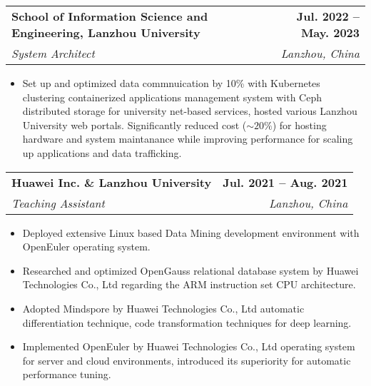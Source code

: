 \documentclass[letterpaper,11pt]{article}
\makeatletter
\newcommand{\resumeItem}[1]{
  \item\small{
    {#1 \vspace{-2pt}}
  }
}
\newcommand{\resumeSubheading}[4]{
  \vspace{-2pt}\item
    \begin{tabular*}{1.0\textwidth}[t]{l@{\extracolsep{\fill}}r}
      \textbf{#1} & \textbf{\small #2} \\
      \textit{\small#3} & \textit{\small #4} \\
    \end{tabular*}\vspace{-7pt}
}
\newcommand{\resumeItemListStart}{\begin{itemize}}
\newcommand{\resumeItemListEnd}{\end{itemize}\vspace{-5pt}}
\makeatother
\begin{document}
    
    \resumeSubheading
    {School of Information Science and Engineering, Lanzhou University}{Jul. 2022 -- May. 2023}
    {System Architect}{Lanzhou, China}
    \resumeItemListStart
    \resumeItem{Set up and optimized data commnuication by 10\% with Kubernetes clustering containerized applications management system with Ceph distributed storage for university net-based services, hosted various Lanzhou University web portals. Significantly reduced cost ($\sim 20\%$) for hosting hardware and system maintanance while improving performance for scaling up applications and data trafficking.}
    \resumeItemListEnd
    \resumeSubheading
      {Huawei Inc. \& Lanzhou University}{Jul. 2021 -- Aug. 2021}
      {Teaching Assistant}{Lanzhou, China}
      \resumeItemListStart
        \resumeItem{Deployed extensive Linux based Data Mining development environment with OpenEuler\textsuperscript{\tiny\textregistered} operating system.}
        \resumeItem{Researched and optimized OpenGauss\textsuperscript{\tiny\textregistered} relational database system by Huawei Technologies Co., Ltd regarding the ARM instruction set CPU architecture.} 
        \resumeItem{Adopted Mindspore\textsuperscript{\tiny\textregistered} by Huawei Technologies Co., Ltd automatic differentiation technique, code transformation techniques for deep learning. }
        \resumeItem{Implemented OpenEuler\textsuperscript{\tiny\textregistered} by Huawei Technologies Co., Ltd operating system for server and cloud environments, introduced its superiority for automatic performance tuning. }
      \resumeItemListEnd
    
\end{document}
